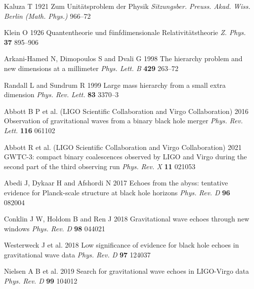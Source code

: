 \documentclass[12pt]{iopart}
\begin{document}
\begin{thebibliography}{50}

Kaluza T 1921 Zum Unitätsproblem der Physik {\it Sitzungsber. Preuss. Akad. Wiss. Berlin (Math. Phys.)} 966--72

Klein O 1926 Quantentheorie und fünfdimensionale Relativitätstheorie {\it Z. Phys.} {\bf 37} 895--906

Arkani-Hamed N, Dimopoulos S and Dvali G 1998 The hierarchy problem and new dimensions at a millimeter {\it Phys. Lett. B} {\bf 429} 263--72

Randall L and Sundrum R 1999 Large mass hierarchy from a small extra dimension {\it Phys. Rev. Lett.} {\bf 83} 3370--3

Abbott B P et al. (LIGO Scientific Collaboration and Virgo Collaboration) 2016 Observation of gravitational waves from a binary black hole merger {\it Phys. Rev. Lett.} {\bf 116} 061102

Abbott R et al. (LIGO Scientific Collaboration and Virgo Collaboration) 2021 GWTC-3: compact binary coalescences observed by LIGO and Virgo during the second part of the third observing run {\it Phys. Rev. X} {\bf 11} 021053

Abedi J, Dykaar H and Afshordi N 2017 Echoes from the abyss: tentative evidence for Planck-scale structure at black hole horizons {\it Phys. Rev. D} {\bf 96} 082004

Conklin J W, Holdom B and Ren J 2018 Gravitational wave echoes through new windows {\it Phys. Rev. D} {\bf 98} 044021

Westerweck J et al. 2018 Low significance of evidence for black hole echoes in gravitational wave data {\it Phys. Rev. D} {\bf 97} 124037

Nielsen A B et al. 2019 Search for gravitational wave echoes in LIGO-Virgo data {\it Phys. Rev. D} {\bf 99} 104012

\end{thebibliography}
\end{document}
